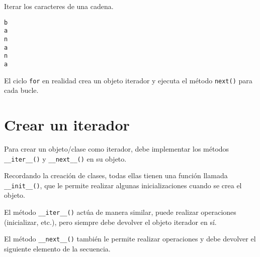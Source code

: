 \begin{code} Iterar los caracteres de una cadena.

\begin{Shaded}
\begin{Highlighting}[]
\OperatorTok{=} 

\end{Highlighting}
\end{Shaded}

\begin{verbatim}
b
a
n
a
n
a

\end{verbatim}
\end{code}

El ciclo \texttt{for} en realidad crea un objeto iterador y ejecuta el
método \texttt{next()} para cada bucle.

\section{Crear un iterador}

Para crear un objeto/clase como iterador, debe implementar los métodos
\texttt{\_\_iter\_\_()} y \texttt{\_\_next\_\_()} en su objeto.

Recordando la creación de clases, todas ellas tienen una función llamada
\texttt{\_\_init\_\_()}, que le permite realizar algunas
inicializaciones cuando se crea el objeto.

El método \texttt{\_\_iter\_\_()} actúa de manera similar, puede
realizar operaciones (inicializar, etc.), pero siempre debe devolver el
objeto iterador en sí.

El método \texttt{\_\_next\_\_()} también le permite realizar
operaciones y debe devolver el siguiente elemento de la secuencia.\\

